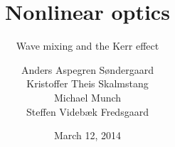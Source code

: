 \documentclass[xcolor=svgnames,smaller,draft]{beamer}
\title{Nonlinear optics}
\subtitle{Wave mixing and the Kerr effect}
\author{
  Anders Aspegren Søndergaard \\
  Kristoffer Theis Skalmstang \\
  Michael Munch \\
  Steffen Videbæk Fredsgaard \\
}
\date{March 12, 2014}
\begin{document}

\frame{\titlepage}

\end{document}
